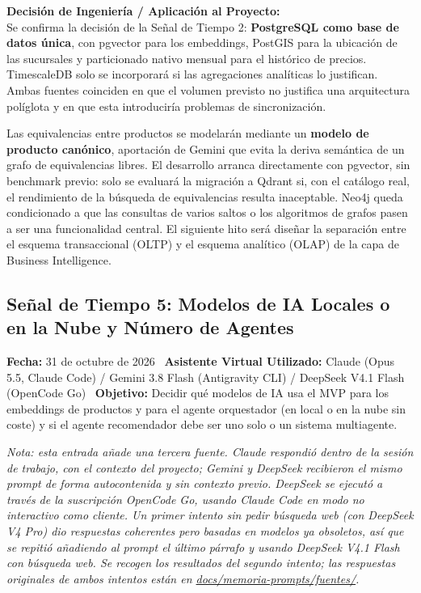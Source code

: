 \textbf{Decisión de Ingeniería / Aplicación al Proyecto:} \\
Se confirma la decisión de la Señal de Tiempo 2: \textbf{PostgreSQL como base de datos única}, con pgvector para los embeddings, PostGIS para la ubicación de las sucursales y particionado nativo mensual para el histórico de precios. TimescaleDB solo se incorporará si las agregaciones analíticas lo justifican. Ambas fuentes coinciden en que el volumen previsto no justifica una arquitectura políglota y en que esta introduciría problemas de sincronización.

Las equivalencias entre productos se modelarán mediante un \textbf{modelo de producto canónico}, aportación de Gemini que evita la deriva semántica de un grafo de equivalencias libres. El desarrollo arranca directamente con pgvector, sin benchmark previo: solo se evaluará la migración a Qdrant si, con el catálogo real, el rendimiento de la búsqueda de equivalencias resulta inaceptable. Neo4j queda condicionado a que las consultas de varios saltos o los algoritmos de grafos pasen a ser una funcionalidad central. El siguiente hito será diseñar la separación entre el esquema transaccional (OLTP) y el esquema analítico (OLAP) de la capa de Business Intelligence.

\vspace{0.5cm}

\subsection{Señal de Tiempo 5: Modelos de IA Locales o en la Nube y Número de Agentes}
\textbf{Fecha:} 31 de octubre de 2026 \
\textbf{Asistente Virtual Utilizado:} Claude (Opus 5.5, Claude Code) / Gemini 3.8 Flash (Antigravity CLI) / DeepSeek V4.1 Flash (OpenCode Go) \
\textbf{Objetivo:} Decidir qué modelos de IA usa el MVP para los embeddings de productos y para el agente orquestador (en local o en la nube sin coste) y si el agente recomendador debe ser uno solo o un sistema multiagente.

\textit{Nota: esta entrada añade una tercera fuente. Claude respondió dentro de la sesión de trabajo, con el contexto del proyecto; Gemini y DeepSeek recibieron el mismo prompt de forma autocontenida y sin contexto previo. DeepSeek se ejecutó a través de la suscripción OpenCode Go, usando Claude Code en modo no interactivo como cliente. Un primer intento sin pedir búsqueda web (con DeepSeek V4 Pro) dio respuestas coherentes pero basadas en modelos ya obsoletos, así que se repitió añadiendo al prompt el último párrafo y usando DeepSeek V4.1 Flash con búsqueda web. Se recogen los resultados del segundo intento; las respuestas originales de ambos intentos están en \url{docs/memoria-prompts/fuentes/}.}

